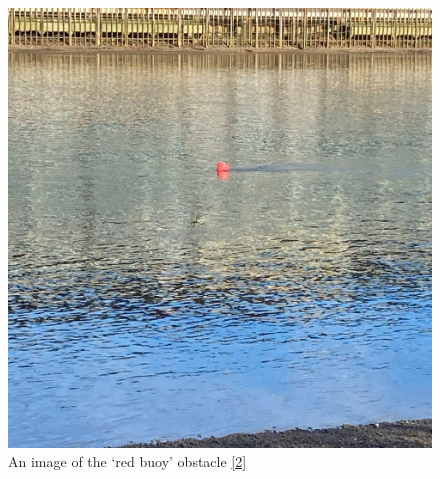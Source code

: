 \documentclass[10pt, a4paper]{article}
\begin{document}
\begin{figure}[h]
\caption{An image of the `red buoy' obstacle \hyperref[myphoto]{[2]}}
\begin{center}
\includegraphics[scale=0.1]{buoy2.jpg}
\end{center}
\end{figure}
\FloatBarrier
\end{document}
